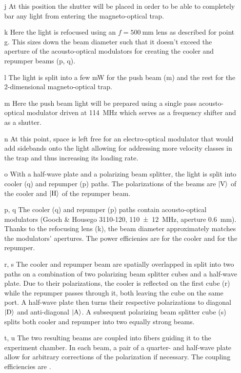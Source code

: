 \begin{itemize}
    \item[j] At this position the shutter will be placed in order to be able to completely bar any light from entering the magneto-optical trap.
    
    \item[k] Here the light is refocused using an $f = \SI{500}{\milli\meter}$ lens as described for point g. This sizes down the beam diameter such that it doesn't exceed the aperture of the acousto-optical modulators for creating the cooler and repumper beams (p, q).
    
    \item[l] The light is split into a few \si{\milli\watt} for the push beam (m) and the rest for the 2-dimensional magneto-optical trap.

    \item[m] Here the push beam light will be prepared using a single pass acousto-optical modulator driven at \SI{+114}{\mega\hertz} which serves as a frequency shifter and as a shutter.
    
    \item[n] At this point, space is left free for an electro-optical modulator that would add sidebands onto the light allowing for addressing more velocity classes in the trap and thus increasing its loading rate.
    
    \item[o] With a half-wave plate and a polarizing beam splitter, the light is split into cooler (q) and repumper (p) paths. The polarizations of the beams are $\Ket{\text{V}}$ of the cooler and $\Ket{\text{H}}$ of the repumper beam.
    
    \item[p, q] The cooler (q) and repumper  (p) paths contain acousto-optical modulators (Gooch \& Housego 3110-120, \SI{110(12)}{\mega\hertz}, aperture \SI{0.6}{\milli\meter}). Thanks to the refocusing lens (k), the beam diameter approximately matches the modulators' apertures. The power efficienies are  for the cooler and for the repumper.
    
    \item[r, s] The cooler and repumper beam are spatially overlapped in split into two paths on a combination of two polarizing beam splitter cubes and a half-wave plate. Due to their polarizations, the cooler is reflected on the first cube (r) while the repumper passes through it, both leaving the cube on the same port. A half-wave plate then turns their respective polarizations to diagonal $\Ket{\text{D}}$ and anti-diagonal $\Ket{\text{A}}$. A subsequent polarizing beam splitter cube (s) splits both cooler and repumper into two equally strong beams.
    
    \item[t, u] The two resulting beams are coupled into fibers guiding it to the experiment chamber. In each beam, a pair of a quarter- and half-wave plate allow for arbitrary corrections of the polarization if necessary. The coupling efficiencies are .
\end{itemize}

